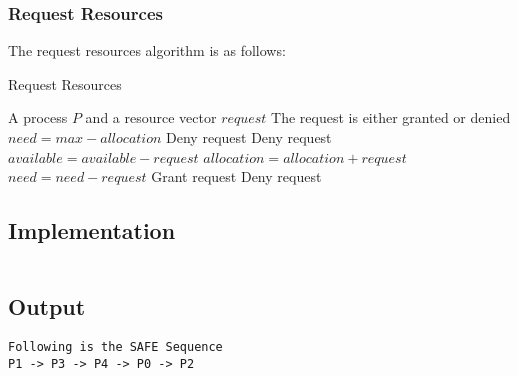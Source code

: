 \subsubsection{Request Resources}

The request resources algorithm is as follows:

\begin{algorithm}
	\caption{Request Resources}
	\label{alg:request_resources}
	\begin{algorithmic}
		\Require A process $P$ and a resource vector $request$
		\Ensure The request is either granted or denied
		\State $need = max - allocation$
		\State Deny request
		\Else
		\State Deny request
		\Else
		\State $available = available - request$
		\State $allocation = allocation + request$
		\State $need = need - request$
		\State Grant request
		\Else
		\State Deny request
		\EndIf
		\EndIf
		\EndIf
	\end{algorithmic}
\end{algorithm}

\subsection{Implementation}

\inputminted[fontsize=\footnotesize,autogobble]{c}{code/bankers.c}

\subsection{Output}
\begin{lstlisting}[style=output]
Following is the SAFE Sequence
P1 -> P3 -> P4 -> P0 -> P2
\end{lstlisting}
